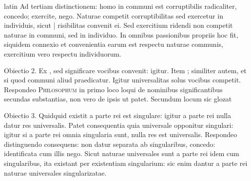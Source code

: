 \begin{otherlanguage*}{latin}
\pstart
 Ad tertiam distinctionem: homo in communi est corruptibilis radicaliter, concedo; exercite, nego. Naturae competit corruptibilitas sed exercetur in individuis, sicut \textnormal{|}  risibilitas convenit ei. Sed exercitium ridendi non competit naturae in communi, sed in individuo. In omnibus passionibus propriis hoc fit, siquidem connexio et convenientia earum est respectu naturae communis, exercitium vero respectu individuorum. 
\pend

\pstart
 Obiectio 2. Ex , sed significare vocibus convenit: igitur. Item  ; similiter autem, et si quod communi aliud praedicatur. Igitur universalitas solus vocibus competit. Respondeo \textsc{Philosophum} in primo loco loqui de nominibus significantibus secundas substantias, non vero de ipsis ut patet. Secundum locum sic glozat  
\pend

\pstart
 Obiectio 3. Quidquid existit a parte rei est singulare: igitur a parte rei nulla datur res universalis. Patet consequentia quia universale opponitur singulari: igitur si a parte rei omnia singularia sunt, nulla res est universalis. Respondeo distinguendo consequens: non datur separata ab singularibus, concedo: identificata cum illis nego. Sicut naturae universales sunt a parte rei idem cum singularibus, ita existant per existentiam singularium: sic enim dantur a parte rei naturae universales singularizatae. 
\pend


\end{otherlanguage*}
